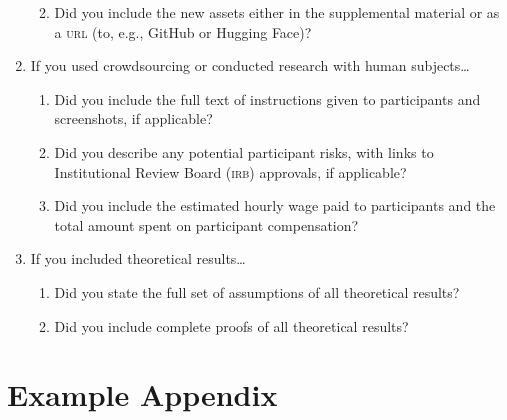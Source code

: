 \documentclass[11pt]{article}
\begin{document}
\begin{enumerate}
\begin{enumerate}
    \answerTODO{}
    \item Did you include the new assets either in the supplemental material or as
    a \textsc{url} (to, e.g., GitHub or Hugging Face)?
    \answerTODO{}
  \end{enumerate}
\item If you used crowdsourcing or conducted research with human subjects\dots
  \begin{enumerate}
  \item Did you include the full text of instructions given to participants and
    screenshots, if applicable?
    \answerTODO{}
  \item Did you describe any potential participant risks, with links to
    Institutional Review Board (\textsc{irb}) approvals, if applicable?
    \answerTODO{}
  \item Did you include the estimated hourly wage paid to participants and the
    total amount spent on participant compensation?
    \answerTODO{}
  \end{enumerate}
\item If you included theoretical results\dots
  \begin{enumerate}
  \item Did you state the full set of assumptions of all theoretical results?
    \answerTODO{}
  \item Did you include complete proofs of all theoretical results?
    \answerTODO{}
  \end{enumerate}
\end{enumerate}

\newpage
\appendix
\section{Example Appendix} %
\end{document}
